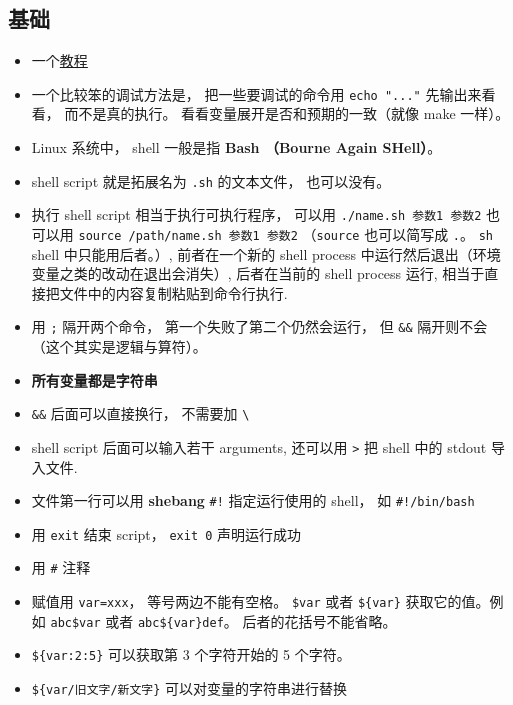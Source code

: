 
\begin{issues}
\issueDraft
\end{issues}


\subsection{基础}
\begin{itemize}
\item 一个\href{https://tldp.org/LDP/abs/html/why-shell.html}{教程}
\item 一个比较笨的调试方法是， 把一些要调试的命令用 \verb`echo "..."` 先输出来看看， 而不是真的执行。 看看变量展开是否和预期的一致（就像 make 一样）。
\item Linux 系统中， shell 一般是指 \textbf{Bash （Bourne Again SHell）}。
\item shell script 就是拓展名为 \verb`.sh` 的文本文件， 也可以没有。
\item 执行 shell script 相当于执行可执行程序， 可以用 \verb`./name.sh 参数1 参数2` 也可以用 \verb`source /path/name.sh 参数1 参数2` （\verb`source` 也可以简写成 \verb`.`。 \verb`sh` shell 中只能用后者。）, 前者在一个新的 shell process 中运行然后退出（环境变量之类的改动在退出会消失）, 后者在当前的 shell process 运行, 相当于直接把文件中的内容复制粘贴到命令行执行.
\item 用 \verb`;` 隔开两个命令， 第一个失败了第二个仍然会运行， 但 \verb`&&` 隔开则不会（这个其实是逻辑与算符）。
\item \textbf{所有变量都是字符串}
\item \verb`&&` 后面可以直接换行， 不需要加 \verb`\`
\item shell script 后面可以输入若干 arguments, 还可以用 \verb`>` 把 shell 中的 stdout 导入文件.
\item 文件第一行可以用 \textbf{shebang} \verb`#!` 指定运行使用的 shell， 如 \verb`#!/bin/bash`
\item 用 \verb`exit` 结束 script， \verb`exit 0` 声明运行成功
\item 用 \verb`#` 注释
\item 赋值用 \verb`var=xxx`， 等号两边不能有空格。 \verb`$var` 或者 \verb`${var}` 获取它的值。例如 \verb`abc$var` 或者 \verb`abc${var}def`。 后者的花括号不能省略。
\item \verb`${var:2:5}` 可以获取第 3 个字符开始的 5 个字符。
\item \verb`${var/旧文字/新文字}` 可以对变量的字符串进行替换

\end{itemize}
